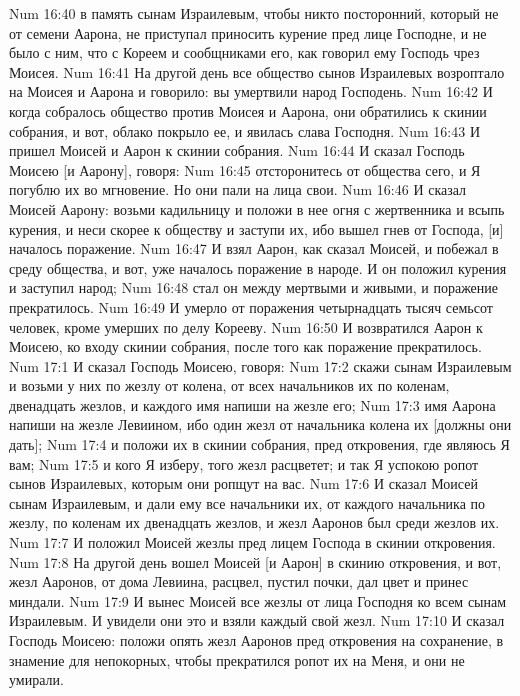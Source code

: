 \vs Num 16:40 в память сынам Израилевым, чтобы никто посторонний, который не от семени Аарона, не приступал приносить курение пред лице Господне, и не было с ним, что с Кореем и сообщниками его, как говорил ему Господь чрез Моисея.
\rsbpar\vs Num 16:41 На другой день все общество сынов Израилевых возроптало на Моисея и Аарона и говорило: вы умертвили народ Господень.
\vs Num 16:42 И когда собралось общество против Моисея и Аарона, они обратились к скинии собрания, и вот, облако покрыло ее, и явилась слава Господня.
\vs Num 16:43 И пришел Моисей и Аарон к скинии собрания.
\rsbpar\vs Num 16:44 И сказал Господь Моисею [и Аарону], говоря:
\vs Num 16:45 отсторонитесь от общества сего, и Я погублю их во мгновение. Но они пали на лица свои.
\vs Num 16:46 И сказал Моисей Аарону: возьми кадильницу и положи в нее огня с жертвенника и всыпь курения, и неси скорее к обществу и заступи их, ибо вышел гнев от Господа, [и] началось поражение.
\vs Num 16:47 И взял Аарон, как сказал Моисей, и побежал в среду общества, и вот, уже началось поражение в народе. И он положил курения и заступил народ;
\vs Num 16:48 стал он между мертвыми и живыми, и поражение прекратилось.
\vs Num 16:49 И умерло от поражения четырнадцать тысяч семьсот человек, кроме умерших по делу Корееву.
\vs Num 16:50 И возвратился Аарон к Моисею, ко входу скинии собрания, после того как поражение прекратилось.
\vs Num 17:1 И сказал Господь Моисею, говоря:
\vs Num 17:2 скажи сынам Израилевым и возьми у них по жезлу от колена, от всех начальников их по коленам, двенадцать жезлов, и каждого имя напиши на жезле его;
\vs Num 17:3 имя Аарона напиши на жезле Левиином, ибо один жезл от начальника колена их [должны они дать];
\vs Num 17:4 и положи их в скинии собрания, пред  откровения, где являюсь Я вам;
\vs Num 17:5 и кого Я изберу, того жезл расцветет; и так Я успокою ропот сынов Израилевых, которым они ропщут на вас.
\rsbpar\vs Num 17:6 И сказал Моисей сынам Израилевым, и дали ему все начальники их, от каждого начальника по жезлу, по коленам их двенадцать жезлов, и жезл Ааронов был среди жезлов их.
\vs Num 17:7 И положил Моисей жезлы пред лицем Господа в скинии откровения.
\vs Num 17:8 На другой день вошел Моисей [и Аарон] в скинию откровения, и вот, жезл Ааронов, от дома Левиина, расцвел, пустил почки, дал цвет и принес миндали.
\vs Num 17:9 И вынес Моисей все жезлы от лица Господня ко всем сынам Израилевым. И увидели они это и взяли каждый свой жезл.
\rsbpar\vs Num 17:10 И сказал Господь Моисею: положи опять жезл Ааронов пред  откровения на сохранение, в знамение для непокорных, чтобы прекратился ропот их на Меня, и они не умирали.
